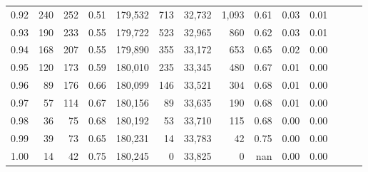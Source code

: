 \begin{tabular}{rrrrrrrrrrrrrr}
0.92 &    240 &  252 &  0.51 &  179,532 &      713 &  32,732 &   1,093 &  0.61 &  0.03 &      0.01 \\
0.93 &    190 &  233 &  0.55 &  179,722 &      523 &  32,965 &     860 &  0.62 &  0.03 &      0.01 \\
0.94 &    168 &  207 &  0.55 &  179,890 &      355 &  33,172 &     653 &  0.65 &  0.02 &      0.00 \\
0.95 &    120 &  173 &  0.59 &  180,010 &      235 &  33,345 &     480 &  0.67 &  0.01 &      0.00 \\
0.96 &     89 &  176 &  0.66 &  180,099 &      146 &  33,521 &     304 &  0.68 &  0.01 &      0.00 \\
0.97 &     57 &  114 &  0.67 &  180,156 &       89 &  33,635 &     190 &  0.68 &  0.01 &      0.00 \\
0.98 &     36 &   75 &  0.68 &  180,192 &       53 &  33,710 &     115 &  0.68 &  0.00 &      0.00 \\
0.99 &     39 &   73 &  0.65 &  180,231 &       14 &  33,783 &      42 &  0.75 &  0.00 &      0.00 \\
1.00 &     14 &   42 &  0.75 &  180,245 &        0 &  33,825 &       0 &   nan &  0.00 &      0.00 \\
\bottomrule
\end{tabular}
